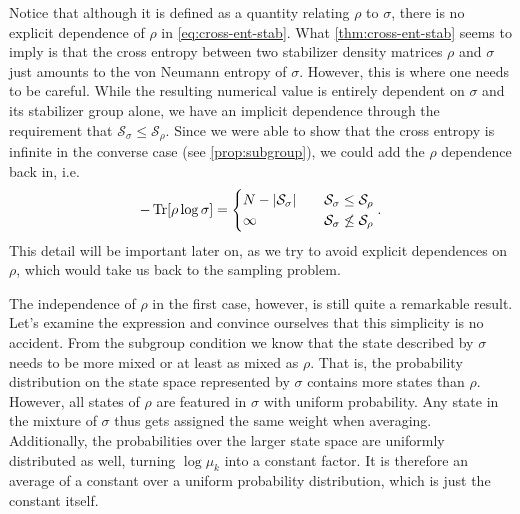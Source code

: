 Notice that although it is defined as a quantity relating $\rho$ to $\sigma$,
there is no explicit dependence of $\rho$ in \cref{eq:cross-ent-stab}.
What \cref{thm:cross-ent-stab} seems to imply is that the cross entropy between two stabilizer
density matrices $\rho$ and $\sigma$ just amounts to the von Neumann entropy of
$\sigma$. However, this is where one needs to be careful. While the resulting
numerical value is entirely dependent on $\sigma$ and its stabilizer group
alone, we have an implicit dependence through the requirement that
$\mathcal{S}_\sigma \leq \mathcal{S}_\rho$. Since we were able to show that the
cross entropy is infinite in the converse case (see \cref{prop:subgroup}), we
could add the $\rho$ dependence back in, i.e.
\begin{align}\label{eq:cross-ent-cases-infty}
  -\Tr[\rho\log\sigma] = \begin{cases}
    N - \abs{\mathcal{S}_\sigma} &\quad{\mathcal{S}_\sigma \leq
    \mathcal{S}_\rho}\\
      \infty &\quad{\mathcal{S}_\sigma \not\leq \mathcal{S}_\rho}
  \end{cases}
.\end{align}
This detail will be important later on, as we try to avoid explicit
dependences on $\rho$, which would take us back to the sampling problem.

The independence of $\rho$ in the first case, however, is still quite a
remarkable result. Let's examine the expression and convince ourselves that
this simplicity is no accident.
From the subgroup condition we know that the state
described by $\sigma$ needs to be more mixed or at least as mixed as $\rho$.
That is, the probability distribution on the state space represented by $\sigma$ contains
more states than $\rho$. However, all states of $\rho$ are featured in
$\sigma$ with uniform probability. Any state in the mixture of $\sigma$ thus
gets assigned the same weight when averaging. Additionally, the probabilities
over the larger state space are uniformly distributed as well, turning $\log
\mu_k$ into a constant factor. It is therefore an average of a constant over a
uniform probability distribution, which is just the constant itself. 

%

